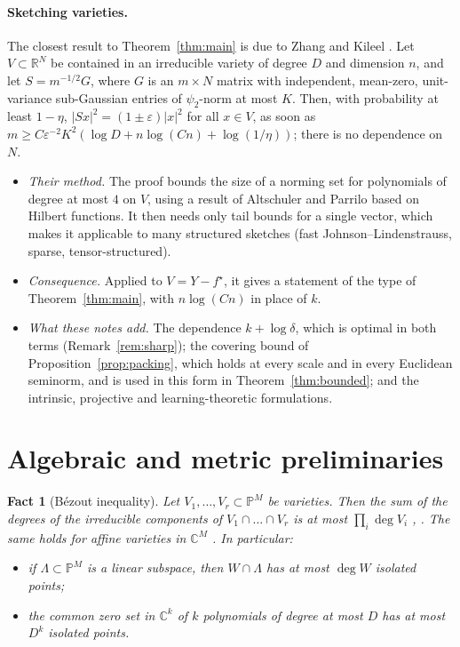 \documentclass[11pt]{article}
\newtheorem{fact}[theorem]{Fact}
\theoremstyle{definition}
\numberwithin{equation}{section}
\newcommand{\R}{\mathbb{R}}
\newcommand{\C}{\mathbb{C}}
\newcommand{\PP}{\mathbb{P}}
\newcommand{\eps}{\varepsilon}
\newcommand{\fs}{f^{\star}}
\begin{document}
\paragraph{Sketching varieties.} The closest result to Theorem~\ref{thm:main} is due to Zhang and Kileel \cite[Thm.~2.7 and Example~2.9]{ZhangKileel25}. Let $V\subset\R^N$ be contained in an irreducible variety of degree $D$ and dimension $n$, and let $S=m^{-1/2}G$, where $G$ is an $m\times N$ matrix with independent, mean-zero, unit-variance sub-Gaussian entries of $\psi_2$-norm at most $K$. Then, with probability at least $1-\eta$, $|Sx|^2=(1\pm\eps)|x|^2$ for all $x\in V$, as soon as $m\ge C\eps^{-2}K^2(\log D+n\log(Cn)+\log(1/\eta))$; there is no dependence on $N$.
\begin{itemize}
\item \emph{Their method.} The proof bounds the size of a norming set for polynomials of degree at most $4$ on $V$, using a result of Altschuler and Parrilo \cite{AltschulerParrilo} based on Hilbert functions. It then needs only tail bounds for a single vector, which makes it applicable to many structured sketches (fast Johnson--Lindenstrauss, sparse, tensor-structured).
\item \emph{Consequence.} Applied to $V=Y-\fs$, it gives a statement of the type of Theorem~\ref{thm:main}, with $n\log(Cn)$ in place of $k$.
\item \emph{What these notes add.} The dependence $k+\log\delta$, which is optimal in both terms (Remark~\ref{rem:sharp}); the covering bound of Proposition~\ref{prop:packing}, which holds at every scale and in every Euclidean seminorm, and is used in this form in Theorem~\ref{thm:bounded}; and the intrinsic, projective and learning-theoretic formulations.
\end{itemize}

\section{Algebraic and metric preliminaries}\label{sec:prelim}

\begin{fact}[B\'ezout inequality]\label{fact:bezout}
Let $V_1,\dots,V_r\subset\PP^M$ be varieties. Then the sum of the degrees of the irreducible components of $V_1\cap\dots\cap V_r$ is at most $\prod_i\deg V_i$ \cite[Example~8.4.6]{Fulton}, \cite{Heintz}. The same holds for affine varieties in $\C^M$ \cite{Heintz}. In particular:
\begin{itemize}
\item if $\Lambda\subset\PP^M$ is a linear subspace, then $W\cap\Lambda$ has at most $\deg W$ isolated points;
\item the common zero set in $\C^k$ of $k$ polynomials of degree at most $D$ has at most $D^k$ isolated points.
\end{itemize}
\end{fact}
\end{document}
